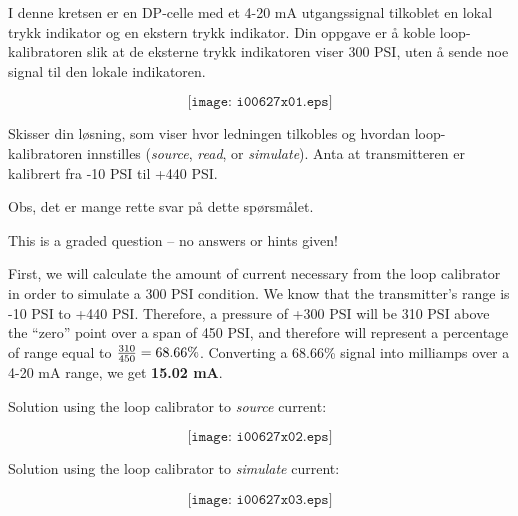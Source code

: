 

I denne kretsen er en DP-celle med et 4-20 mA utgangssignal tilkoblet en lokal trykk indikator og en ekstern trykk indikator. Din oppgave er å koble loop-kalibratoren slik at de eksterne trykk indikatoren viser 300 PSI, uten å sende noe signal til den lokale indikatoren. 

$$\texttt{[image: i00627x01.eps]}$$

Skisser din løsning, som viser hvor ledningen tilkobles og hvordan loop-kalibratoren innstilles ({\it source}, {\it read}, or {\it simulate}). Anta at transmitteren er kalibrert fra -10 PSI til +440 PSI.  


\vfil

Obs, det er mange rette svar på dette spørsmålet. 

\eject






This is a graded question -- no answers or hints given!







First, we will calculate the amount of current necessary from the loop calibrator in order to simulate a 300 PSI condition.  We know that the transmitter's range is -10 PSI to +440 PSI.  Therefore, a pressure of +300 PSI will be 310 PSI above the ``zero'' point over a span of 450 PSI, and therefore will represent a percentage of range equal to ${310 \over 450} = 68.66\%$.  Converting a 68.66\% signal into milliamps over a 4-20 mA range, we get {\bf 15.02 mA}.

\vskip 10pt

Solution using the loop calibrator to {\it source} current:

$$\texttt{[image: i00627x02.eps]}$$

\vfil \eject

Solution using the loop calibrator to {\it simulate} current:

$$\texttt{[image: i00627x03.eps]}$$




